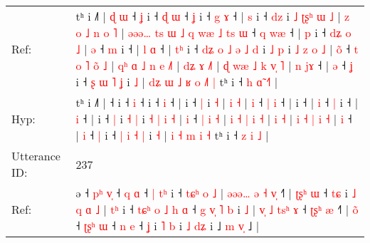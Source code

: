 \documentclass[10pt]{article}
\DeclareRobustCommand{\hl}[1]{{\textcolor{red}{#1}}}
\begin{document}
\begin{longtable}{ll}
Ref: & tʰ i ˩˥ |\hl{ }\hl{ɖ}\hl{ }\hl{ɯ} ˧\hl{ }\hl{ʝ} i ˧\hl{ }\hl{ɖ} \hl{ɯ} ˧\hl{ }\hl{ʝ} i ˧\hl{ }\hl{g} \hl{ɤ} ˧ |\hl{ }\hl{s} i ˧ \hl{d}\hl{z} i\hl{ }\hl{˩}\hl{ }\hl{ʈ}\hl{ʂ}\hl{ʰ}\hl{ }\hl{ɯ} \hl{˩} |\hl{ }\hl{z}\hl{ }\hl{o}\hl{ }\hl{˩}\hl{ }\hl{n} \hl{o} \hl{˥} |\hl{ }\hl{ə}\hl{ə}\hl{ə}\hl{…}\hl{ }\hl{t}\hl{s}\hl{ }\hl{ɯ}\hl{ }\hl{˩}\hl{ }\hl{q}\hl{ }\hl{w}\hl{æ}\hl{ }\hl{˩}\hl{ }\hl{t}\hl{s} \hl{ɯ} ˧ \hl{q} \hl{w}\hl{æ} ˧ |\hl{ }\hl{p} i ˧\hl{ }\hl{d}\hl{ʑ}\hl{ }\hl{o}\hl{ }\hl{˩} | \hl{ə} ˧ \hl{m} i ˧ |\hl{ }\hl{l} \hl{ɑ} ˧ |\hl{ }\hl{t}\hl{ʰ} i ˧\hl{ }\hl{d}\hl{ʑ}\hl{ }\hl{o}\hl{ }\hl{˩}\hl{ }\hl{ə}\hl{ }\hl{˩} \hl{d} i \hl{˩} \hl{p} i \hl{˩} \hl{z} \hl{o} \hl{˩} | \hl{o}\hl{̃} ˧\hl{ }\hl{t}\hl{ }\hl{o} \hl{˥} \hl{o}\hl{̃} \hl{˩} |\hl{ }\hl{q}\hl{ʰ} \hl{ɑ} \hl{˩} \hl{n} \hl{e} \hl{˩}\hl{˥} |\hl{ }\hl{d}\hl{ʑ} \hl{ɤ} \hl{˩}\hl{˥} |\hl{ }\hl{ɖ} \hl{w}\hl{æ} \hl{˩} \hl{k} \hl{v}\hl{̩} \hl{˥} |\hl{ }\hl{n} \hl{j}\hl{ɤ} ˧ | \hl{ə} ˧ \hl{ʝ} i ˧ \hl{ʂ} \hl{ɯ} \hl{˥} \hl{ʝ} i \hl{˩} |\hl{ }\hl{d}\hl{ʑ}\hl{ }\hl{ɯ} \hl{˩} \hl{ʁ} \hl{o} \hl{˩}\hl{˥} \hl{|} tʰ i ˧ \hl{h} \hl{ɑ}\hl{̃} \hl{˧}\hl{˥} |
 \\
Hyp: & tʰ i ˩˥ |\hl{}\hl{}\hl{}\hl{} ˧\hl{}\hl{} i ˧\hl{}\hl{} \hl{i} ˧\hl{}\hl{} i ˧\hl{}\hl{} \hl{i} ˧ |\hl{}\hl{} i ˧ \hl{}\hl{|} i\hl{}\hl{}\hl{}\hl{}\hl{}\hl{}\hl{}\hl{} \hl{˧} |\hl{}\hl{}\hl{}\hl{}\hl{}\hl{}\hl{}\hl{} \hl{i} \hl{˧} |\hl{}\hl{}\hl{}\hl{}\hl{}\hl{}\hl{}\hl{}\hl{}\hl{}\hl{}\hl{}\hl{}\hl{}\hl{}\hl{}\hl{}\hl{}\hl{}\hl{}\hl{}\hl{} \hl{i} ˧ \hl{|} \hl{}\hl{i} ˧ |\hl{}\hl{} i ˧\hl{}\hl{}\hl{}\hl{}\hl{}\hl{}\hl{} | \hl{i} ˧ \hl{|} i ˧ |\hl{}\hl{} \hl{i} ˧ |\hl{}\hl{}\hl{} i ˧\hl{}\hl{}\hl{}\hl{}\hl{}\hl{}\hl{}\hl{}\hl{}\hl{}\hl{} \hl{|} i \hl{˧} \hl{|} i \hl{˧} \hl{|} \hl{i} \hl{˧} | \hl{}\hl{i} ˧\hl{}\hl{}\hl{}\hl{} \hl{|} \hl{}\hl{i} \hl{˧} |\hl{}\hl{}\hl{} \hl{i} \hl{˧} \hl{|} \hl{i} \hl{}\hl{˧} |\hl{}\hl{}\hl{} \hl{i} \hl{}\hl{˧} |\hl{}\hl{} \hl{}\hl{i} \hl{˧} \hl{|} \hl{}\hl{i} \hl{˧} |\hl{}\hl{} \hl{}\hl{i} ˧ | \hl{i} ˧ \hl{|} i ˧ \hl{|} \hl{i} \hl{˧} \hl{|} i \hl{˧} |\hl{}\hl{}\hl{}\hl{}\hl{} \hl{i} \hl{˧} \hl{m} \hl{}\hl{i} \hl{˧} tʰ i ˧ \hl{z} \hl{}\hl{i} \hl{}\hl{˩} |
 \\
\midrule
Utterance ID: & 237 \\
Ref: & ə ˧\hl{ }\hl{p}\hl{ʰ} \hl{v}\hl{̩} ˧\hl{ }\hl{q} \hl{ɑ} ˧\hl{ }\hl{|}\hl{ }\hl{t}\hl{ʰ} i ˧ \hl{t}\hl{ɕ}\hl{ʰ} \hl{o} \hl{˩} | \hl{ə}\hl{ə}\hl{ə}\hl{…} \hl{ə} \hl{˧} \hl{v}\hl{̩} ˧\hl{˥} |\hl{ }\hl{ʈ}\hl{ʂ}\hl{ʰ} \hl{ɯ} ˧ \hl{t}\hl{ɕ} i \hl{˩} \hl{q} \hl{ɑ} \hl{˩} |\hl{ }\hl{t}\hl{ʰ} i ˧ \hl{t}\hl{ɕ}\hl{ʰ} \hl{o} \hl{˩} \hl{h} \hl{ɑ} ˧ \hl{g} \hl{v}\hl{̩} \hl{˥} \hl{b} i \hl{˩} | \hl{v}\hl{̩} \hl{˩} \hl{t}\hl{s}\hl{ʰ} \hl{ɤ} ˧ \hl{ʈ}\hl{ʂ}\hl{ʰ} \hl{æ} ˧\hl{˥} | \hl{o}\hl{̃} ˧ \hl{ʈ}\hl{ʂ}\hl{ʰ} \hl{ɯ} ˧ \hl{n} \hl{e} ˧ \hl{ʝ} i \hl{˥} \hl{b} i \hl{˩} \hl{d}\hl{ʑ} i ˩ \hl{m} \hl{v}\hl{̩} ˩ |

\end{longtable}
\end{document}
